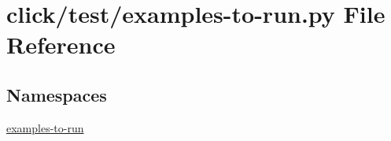 \hypertarget{click_2test_2examples-to-run_8py}{}\section{click/test/examples-\/to-\/run.py File Reference}
\label{click_2test_2examples-to-run_8py}
\subsection*{Namespaces}
\begin{DoxyCompactItemize}
\item 
 \hyperlink{namespaceexamples-to-run}{examples-\/to-\/run}
\end{DoxyCompactItemize}

